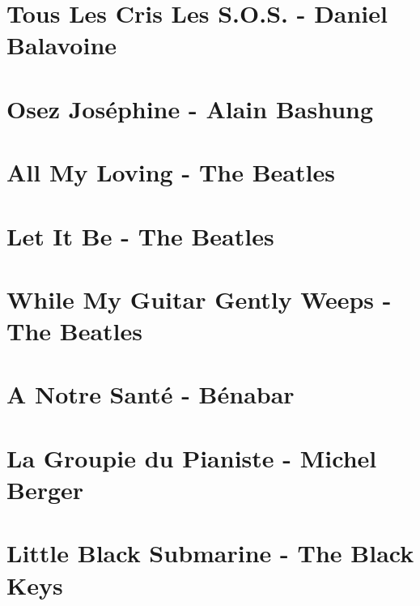 \documentclass[11pt]{article}
\begin{document}
\section{Tous Les Cris Les S.O.S. - Daniel Balavoine}
\begin{guitar}

\end{guitar}

\section{Osez Joséphine - Alain Bashung}
\begin{guitar}

\end{guitar}



\section{All My Loving - The Beatles}


\section{Let It Be - The Beatles}
\begin{guitar}

\end{guitar}

\section{While My Guitar Gently Weeps - The Beatles}




\section{A Notre Santé - Bénabar}



\section{La Groupie du Pianiste - Michel Berger}


\section{Little Black Submarine - The Black Keys}
\begin{guitar}

\end{guitar}
\end{document}

